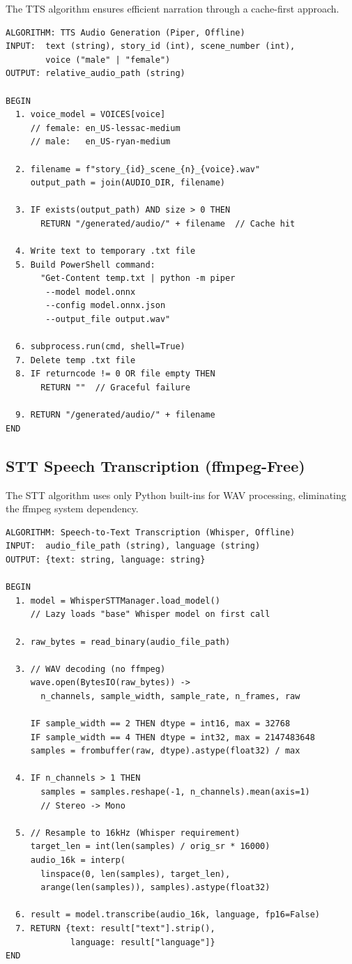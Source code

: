 The TTS algorithm ensures efficient narration through a cache-first approach.

\begin{verbatim}
ALGORITHM: TTS Audio Generation (Piper, Offline)
INPUT:  text (string), story_id (int), scene_number (int),
        voice ("male" | "female")
OUTPUT: relative_audio_path (string)

BEGIN
  1. voice_model = VOICES[voice]
     // female: en_US-lessac-medium
     // male:   en_US-ryan-medium
  
  2. filename = f"story_{id}_scene_{n}_{voice}.wav"
     output_path = join(AUDIO_DIR, filename)
  
  3. IF exists(output_path) AND size > 0 THEN
       RETURN "/generated/audio/" + filename  // Cache hit

  4. Write text to temporary .txt file
  5. Build PowerShell command:
       "Get-Content temp.txt | python -m piper
        --model model.onnx
        --config model.onnx.json
        --output_file output.wav"
  
  6. subprocess.run(cmd, shell=True)
  7. Delete temp .txt file
  8. IF returncode != 0 OR file empty THEN
       RETURN ""  // Graceful failure
  
  9. RETURN "/generated/audio/" + filename
END
\end{verbatim}

\subsection{STT Speech Transcription (ffmpeg-Free)}

The STT algorithm uses only Python built-ins for WAV processing, eliminating the ffmpeg system dependency.

\begin{verbatim}
ALGORITHM: Speech-to-Text Transcription (Whisper, Offline)
INPUT:  audio_file_path (string), language (string)
OUTPUT: {text: string, language: string}

BEGIN
  1. model = WhisperSTTManager.load_model()
     // Lazy loads "base" Whisper model on first call

  2. raw_bytes = read_binary(audio_file_path)
  
  3. // WAV decoding (no ffmpeg)
     wave.open(BytesIO(raw_bytes)) ->
       n_channels, sample_width, sample_rate, n_frames, raw
     
     IF sample_width == 2 THEN dtype = int16, max = 32768
     IF sample_width == 4 THEN dtype = int32, max = 2147483648
     samples = frombuffer(raw, dtype).astype(float32) / max

  4. IF n_channels > 1 THEN
       samples = samples.reshape(-1, n_channels).mean(axis=1)
       // Stereo -> Mono

  5. // Resample to 16kHz (Whisper requirement)
     target_len = int(len(samples) / orig_sr * 16000)
     audio_16k = interp(
       linspace(0, len(samples), target_len),
       arange(len(samples)), samples).astype(float32)

  6. result = model.transcribe(audio_16k, language, fp16=False)
  7. RETURN {text: result["text"].strip(),
             language: result["language"]}
END
\end{verbatim}


